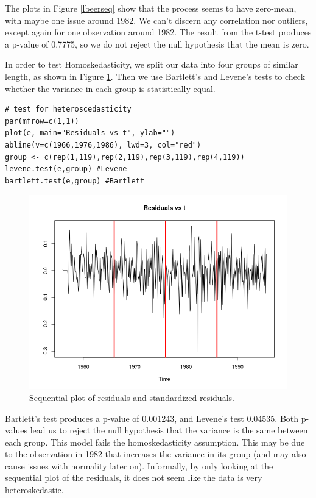 \documentclass[]{article}
\begin{document}
The plots in Figure \ref{lbeerseq} show that the process seems to have zero-mean, with maybe one issue around 1982. We can't discern any correlation nor outliers, except again for one observation around 1982. The result from the t-test produces a p-value of 0.7775, so we do not reject the null hypothesis that the mean is zero.

In order to test Homoskedasticity, we split our data into four groups of similar length, as shown in Figure \ref{lbeerhomo}. Then we use Bartlett's and Levene's tests to check whether the variance in each group is statistically equal.
\begin{Verbatim}[frame=single]
# test for heteroscedasticity
par(mfrow=c(1,1))
plot(e, main="Residuals vs t", ylab="")
abline(v=c(1966,1976,1986), lwd=3, col="red")
group <- c(rep(1,119),rep(2,119),rep(3,119),rep(4,119))
levene.test(e,group) #Levene 
bartlett.test(e,group) #Bartlett 
\end{Verbatim}

\begin{figure}[!ht]
\centering
\includegraphics[width=.8\textwidth]{lbeerhomo.png}
\caption{Sequential plot of residuals and standardized residuals.}
\label{lbeerhomo}
\end{figure}

Bartlett's test produces a p-value of 0.001243, and Levene's test 0.04535. Both p-values lead us to reject the null hypothesis that the variance is the same between each group. This model fails the homoskedasticity assumption. This may be due to the observation in 1982 that increases the variance in its group (and may also cause issues with normality later on). Informally, by only looking at the sequential plot of the residuals, it does not seem like the data is very heteroskedastic.
\end{document}
